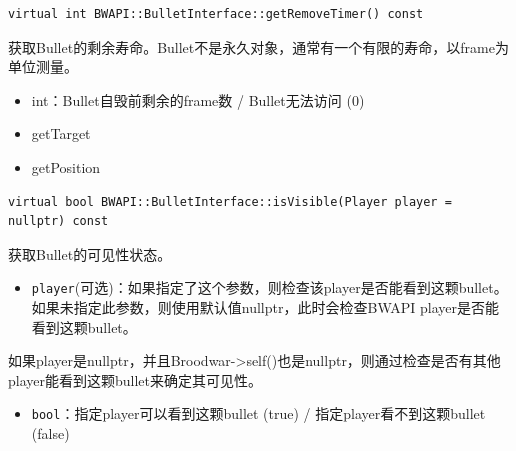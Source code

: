 \begin{tcolorbox}[colback=white, colframe=black!60!white, title=getRemoveTimer(), arc=0mm]
    \begin{verbatim}
virtual int BWAPI::BulletInterface::getRemoveTimer() const
    \end{verbatim}
    获取Bullet的剩余寿命。Bullet不是永久对象，通常有一个有限的寿命，以frame为单位测量。
    \begin{return}
        \begin{itemize}
            \item int：Bullet自毁前剩余的frame数 / Bullet无法访问 (0)
        \end{itemize}
    \end{return}
    \begin{refer}
        \begin{itemize}
            \item getTarget
            \item getPosition
        \end{itemize}
    \end{refer}
\end{tcolorbox}

\begin{tcolorbox}[colback=white, colframe=black!60!white, title=isVisible(), arc=0mm]
    \begin{verbatim}
virtual bool BWAPI::BulletInterface::isVisible(Player player = nullptr) const
    \end{verbatim}
    获取Bullet的可见性状态。
    \begin{parameter}
        \begin{itemize}
            \item \texttt{player}(可选)：如果指定了这个参数，则检查该player是否能看到这颗bullet。如果未指定此参数，则使用默认值nullptr，此时会检查BWAPI player是否能看到这颗bullet。
        \end{itemize}
    \end{parameter}
    \begin{note}
        如果player是nullptr，并且Broodwar->self()也是nullptr，则通过检查是否有其他player能看到这颗bullet来确定其可见性。
    \end{note}
    \begin{return}
        \begin{itemize}
            \item \texttt{bool}：指定player可以看到这颗bullet (true) / 指定player看不到这颗bullet (false)
        \end{itemize}
    \end{return}
\end{tcolorbox}